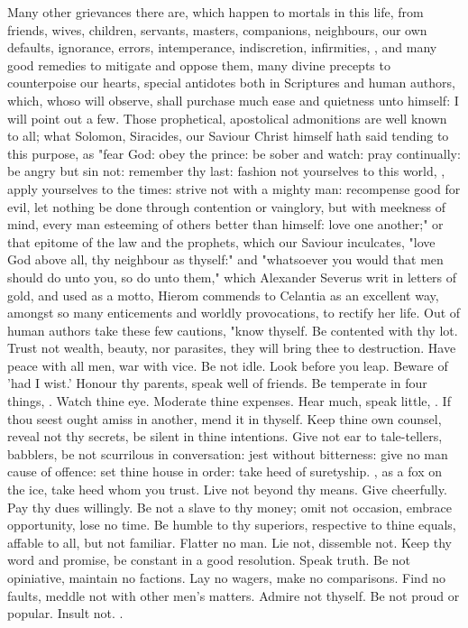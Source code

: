 {Many other grievances there are, which happen to mortals in this life, from friends, wives, children, servants, masters, companions, neighbours, our own defaults, ignorance, errors, intemperance, indiscretion, infirmities, \etc{}, and many good remedies to mitigate and oppose them, many divine precepts to counterpoise our hearts, special antidotes both in Scriptures and human authors, which, whoso will observe, shall purchase much ease and quietness unto himself: I will point out a few. Those prophetical, apostolical admonitions are well known to all; what Solomon, Siracides, our Saviour Christ himself hath said tending to this purpose, as "fear God: obey the prince: be sober and watch: pray continually: be angry but sin not: remember thy last: fashion not yourselves to this world, \etc{}, apply yourselves to the times: strive not with a mighty man: recompense good for evil, let nothing be done through contention or vainglory, but with meekness of mind, every man esteeming of others better than himself: love one another;" or that epitome of the law and the prophets, which our Saviour inculcates, "love God above all, thy neighbour as thyself:" and "whatsoever you would that men should do unto you, so do unto them," which Alexander Severus writ in letters of gold, and used as a motto, Hierom commends to Celantia as an excellent way, amongst so many enticements and worldly provocations, to rectify her life. Out of human authors take these few cautions, "know thyself. Be contented with thy lot. Trust not wealth, beauty, nor parasites, they will bring thee to destruction. Have peace with all men, war with vice. Be not idle. Look before you leap. Beware of 'had I wist.' Honour thy parents, speak well of friends. Be temperate in four things, . Watch thine eye. Moderate thine expenses. Hear much, speak little, . If thou seest ought amiss in another, mend it in thyself. Keep thine own counsel, reveal not thy secrets, be silent in thine intentions. Give not ear to tale-tellers, babblers, be not scurrilous in conversation: jest without bitterness: give no man cause of offence: set thine house in order: take heed of suretyship. , as a fox on the ice, take heed whom you trust. Live not beyond thy means. Give cheerfully. Pay thy dues willingly. Be not a slave to thy money; omit not occasion, embrace opportunity, lose no time. Be humble to thy superiors, respective to thine equals, affable to all, but not familiar. Flatter no man. Lie not, dissemble not. Keep thy word and promise, be constant in a good resolution. Speak truth. Be not opiniative, maintain no factions. Lay no wagers, make no comparisons. Find no faults, meddle not with other men's matters. Admire not thyself. Be not proud or popular. Insult not. . }
